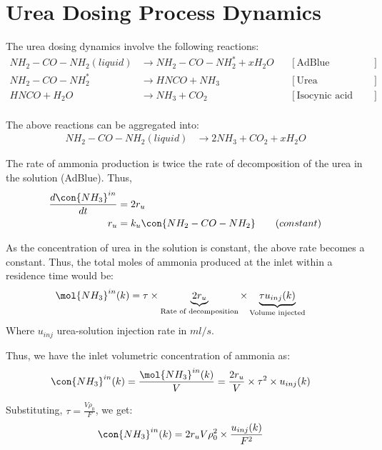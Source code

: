 \newpage
\section{Urea Dosing Process Dynamics}
The urea dosing dynamics involve the following reactions:
\begin{align*}
    NH_2 - CO - NH_2 (liquid) &\longrightarrow NH_2 - CO - NH_2^* + x H_2 O
                & &[\text{AdBlue evaporation}] \\
    NH_2 - CO - NH_2^*  &\longrightarrow  HNCO + NH_3
                & &[\text{Urea decomposition}] \\
    HNCO + H_2O &\longrightarrow NH_3 + CO_2
                & &[\text{Isocynic acid hydrolysis}] \\
\end{align*}

The above reactions can be aggregated into:
\begin{align*}
    NH_2 - CO - NH_2 (liquid) &\longrightarrow 2 NH_3 + CO_2 + x H_2 O
\end{align*}

The rate of ammonia production is twice the rate of decomposition of the urea in the solution (AdBlue). Thus,
\begin{align*}
    \frac{d \con{NH_3}^{in}}{dt} &= 2 r_{u}\\
    r_{u} &= k_{u} \con{NH_2 - CO - NH_2} \qquad (constant)
\end{align*}

As the concentration of urea in the solution is constant, the above rate becomes a constant. Thus, the total moles of
ammonia produced at the inlet within a residence time would be:
\begin{align*}
    \mol{NH_3}^{in} (k) &= \tau \times \underbrace{2 r_{u}}_{\text{Rate of decomposition}} \times \underbrace{\tau u_{inj} (k)}_{\text{Volume injected}}
\end{align*}
Where $u_{inj}$ urea-solution injection rate in $ml/s$.

Thus, we have the inlet volumetric concentration of ammonia as:
\begin{align*}
    \con{NH_3}^{in} (k) &= \frac{\mol{NH_3}^{in} (k)}{V}
                          = \frac{2 r_u}{V} \times \tau^2 \times u_{inj} (k)
\end{align*}

Substituting, $\tau = \frac{V \rho_0}{F}$, we get:
\begin{align}
    \con{NH_3}^{in} (k) &= 2r_u V \rho^2_0 \times \frac{u_{inj}(k)}{F^2}
\end{align}


